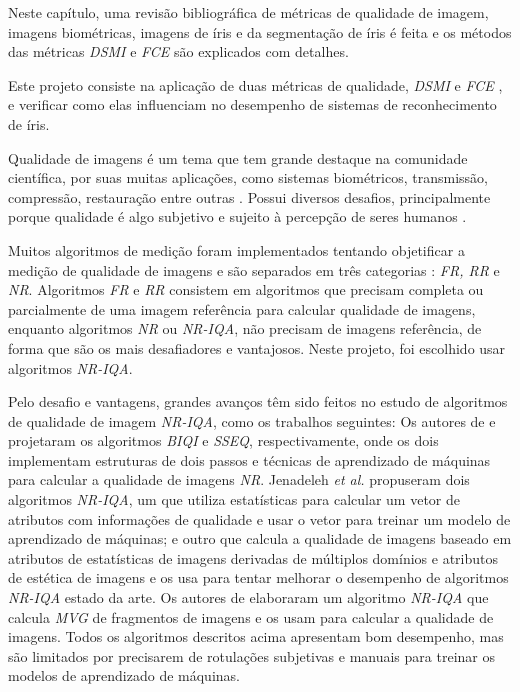 
\par Neste capítulo, uma revisão bibliográfica de métricas de qualidade de imagem, imagens biométricas, imagens de íris e da segmentação de íris é feita e os métodos das métricas \textit{\acrfull{DSMI}} e \textit{\acrfull{FCE}} são explicados com detalhes.

\par Este projeto consiste na aplicação de duas métricas de qualidade, \textit{\acrshort{DSMI}} \cite{Jenadeleh_2018_CVPR_Workshops} e \textit{\acrshort{FCE}} \cite{du2010}, e verificar como elas influenciam no desempenho de sistemas de reconhecimento de íris.

\par Qualidade de imagens é um tema que tem grande destaque na comunidade científica, por suas muitas aplicações, como sistemas biométricos, transmissão, compressão, restauração entre outras \cite{zhang2015}. Possui diversos desafios, principalmente porque qualidade é algo subjetivo e sujeito à percepção de seres humanos \cite{xu2016}. 

\par Muitos algoritmos de medição foram implementados tentando objetificar a medição de qualidade de imagens e são separados em três categorias \cite{xu2016}: \textit{\acrfull{FR}, \acrfull{RR}} e \textit{\acrfull{NR}}. Algoritmos \textit{\acrshort{FR}} e \textit{RR} consistem em algoritmos que precisam completa ou parcialmente de uma imagem referência para calcular qualidade de imagens, enquanto algoritmos \textit{\acrshort{NR}} ou \textit{\acrfull{NR-IQA}}, não precisam de imagens referência, de forma que são os mais desafiadores e vantajosos. Neste projeto, foi escolhido usar algoritmos \textit{\acrshort{NR-IQA}}.

\par Pelo desafio e vantagens, grandes avanços têm sido feitos no estudo de algoritmos de qualidade de imagem \textit{\acrshort{NR-IQA}}, como os trabalhos seguintes: Os autores de \cite{moorthy2010} e \cite{liu2014} projetaram os algoritmos \textit{\acrfull{BIQI}} e \textit{\acrfull{SSEQ}}, respectivamente, onde os dois implementam estruturas de dois passos e técnicas de aprendizado de máquinas para calcular a qualidade de imagens \textit{\acrshort{NR}}. Jenadeleh \textit{et al.} \cite{jenadeleh2016, jenadeleh2017} propuseram dois algoritmos \textit{\acrshort{NR-IQA}}, um que utiliza estatísticas para calcular um vetor de atributos com informações de qualidade e usar o vetor para treinar um modelo de aprendizado de máquinas; e outro que calcula a qualidade de imagens baseado em atributos de estatísticas de imagens derivadas de múltiplos domínios e atributos de estética de imagens e os usa para tentar melhorar o desempenho de algoritmos \textit{\acrshort{NR-IQA}} estado da arte. Os autores de \cite{zhang2015} elaboraram um algoritmo \textit{\acrshort{NR-IQA}} que calcula \textit{\acrfull{MVG}} de fragmentos de imagens e os usam para calcular a qualidade de imagens. Todos os algoritmos descritos acima apresentam bom desempenho, mas são limitados por precisarem de rotulações subjetivas e manuais para treinar os modelos de aprendizado de máquinas.

